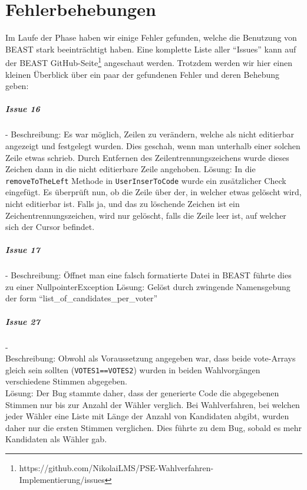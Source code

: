 \documentclass[a4paper]{scrreprt}
\begin{document}
\chapter{Fehlerbehebungen}
Im Laufe der Phase haben wir einige Fehler gefunden, welche die Benutzung von
BEAST stark beeinträchtigt haben. Eine komplette Liste aller "`Issues"' kann auf
der BEAST
GitHub-Seite\footnote{https://github.com/NikolaiLMS/PSE-Wahlverfahren-Implementierung/issues}
angeschaut werden. Trotzdem werden wir hier einen kleinen Überblick über ein
paar der gefundenen Fehler und deren Behebung geben:

\paragraph{Issue 16}- \newline
Beschreibung: Es war möglich, Zeilen zu verändern, welche als nicht editierbar angezeigt und festgelegt wurden. Dies geschah, wenn man unterhalb einer solchen Zeile etwas schrieb. Durch Entfernen des Zeilentrennungszeichens wurde dieses Zeichen dann in die nicht editierbare Zeile angehoben.
\newline
Lösung: In die \verb!removeToTheLeft! Methode in \verb!UserInserToCode! wurde ein zusätzlicher Check eingefügt. Es überprüft nun, ob die Zeile über der, in welcher etwas gelöscht wird, nicht editierbar ist. Falls ja, und das zu löschende Zeichen ist ein Zeichentrennungszeichen, wird nur gelöscht, falls die Zeile leer ist, auf welcher sich der Cursor befindet.

\paragraph{Issue 17}- \newline
Beschreibung: Öffnet man eine falsch formatierte Datei in BEAST führte dies zu
einer NullpointerException
\newline
Lösung: Gelöst durch zwingende Namensgebung der form
"`list_of_candidates_per_voter"' 

\paragraph{Issue 27}- \\
Beschreibung: Obwohl als Voraussetzung angegeben war, dass beide vote-Arrays gleich sein sollten (\verb!VOTES1==VOTES2!) wurden in beiden Wahlvorgängen verschiedene Stimmen abgegeben.\\
Lösung: Der Bug stammte daher, dass der generierte Code die abgegebenen Stimmen nur bis zur Anzahl der Wähler verglich. Bei Wahlverfahren, bei welchen jeder Wähler eine Liste mit Länge der Anzahl von Kandidaten abgibt, wurden daher nur die ersten Stimmen verglichen. Dies führte zu dem Bug, sobald es mehr Kandidaten als Wähler gab.
\end{document}
